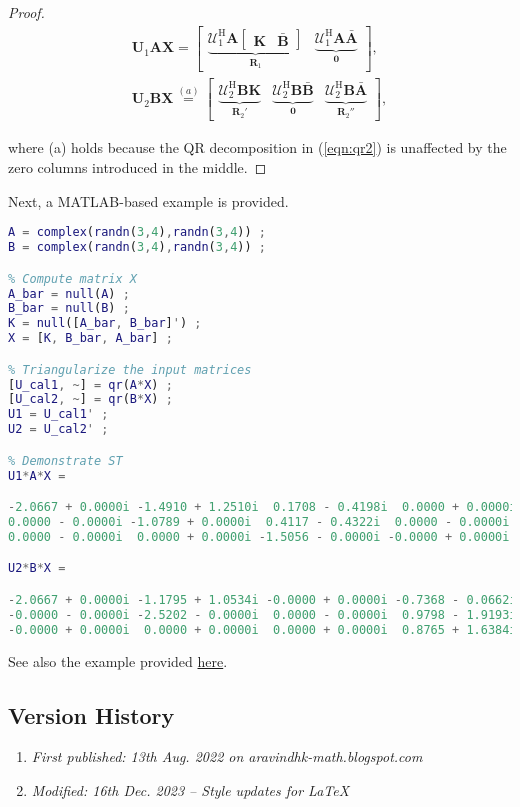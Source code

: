 \begin{proof}
\begin{align}\boldsymbol{U}_1\boldsymbol{A}\boldsymbol{X} = \begin{bmatrix}\underbrace{\boldsymbol{\mathcal{U}}_1^\mathrm{H} \boldsymbol{A} \begin{bmatrix}\boldsymbol{K} & \bar{\boldsymbol{B}}\end{bmatrix}}_{\boldsymbol{R}_1} &  \underbrace{\boldsymbol{\mathcal{U}}_1^\mathrm{H} \boldsymbol{A} \bar{\boldsymbol{A}}}_{\boldsymbol{0}}\end{bmatrix}, \\ \boldsymbol{U}_2\boldsymbol{B}\boldsymbol{X} \overset{(a)}{=} \begin{bmatrix} \underbrace{\boldsymbol{\mathcal{U}}_2^\mathrm{H} \boldsymbol{B} \boldsymbol{K}}_{\boldsymbol{R}_2'} & \underbrace{\boldsymbol{\mathcal{U}}_2^\mathrm{H} \boldsymbol{B} \bar{\boldsymbol{B}}}_{\boldsymbol{0}} &  \underbrace{\boldsymbol{\mathcal{U}}_2^\mathrm{H} \boldsymbol{B} \bar{\boldsymbol{A}}}_{\boldsymbol{R}_2''}\end{bmatrix},\end{align}

where (a) holds because the QR decomposition in (\ref{eqn:qr2}) is unaffected by the zero columns introduced in the middle.
\end{proof}

Next, a MATLAB-based example is provided.

\begin{lstlisting}[language=MATLAB,numbers=none]
% Generate compatible matrices
A = complex(randn(3,4),randn(3,4)) ;
B = complex(randn(3,4),randn(3,4)) ;

% Compute matrix X
A_bar = null(A) ;
B_bar = null(B) ;
K = null([A_bar, B_bar]') ;
X = [K, B_bar, A_bar] ;

% Triangularize the input matrices
[U_cal1, ~] = qr(A*X) ;
[U_cal2, ~] = qr(B*X) ;
U1 = U_cal1' ;
U2 = U_cal2' ;

% Demonstrate ST
U1*A*X =

-2.0667 + 0.0000i -1.4910 + 1.2510i  0.1708 - 0.4198i  0.0000 + 0.0000i
0.0000 - 0.0000i -1.0789 + 0.0000i  0.4117 - 0.4322i  0.0000 - 0.0000i
0.0000 - 0.0000i  0.0000 + 0.0000i -1.5056 - 0.0000i -0.0000 + 0.0000i

U2*B*X =

-2.0667 + 0.0000i -1.1795 + 1.0534i -0.0000 + 0.0000i -0.7368 - 0.0662i
-0.0000 - 0.0000i -2.5202 - 0.0000i  0.0000 - 0.0000i  0.9798 - 1.9193i
-0.0000 + 0.0000i  0.0000 + 0.0000i  0.0000 + 0.0000i  0.8765 + 1.6384i
\end{lstlisting}

See also the example provided \href{https://gitlab.com/aravindh.krishnamoorthy/mimo-noma}{here}.

\subsection{Version History}
\begin{enumerate}
	\item \emph{First published: 13th Aug. 2022 on aravindhk-math.blogspot.com}
	\item \emph{Modified: 16th Dec. 2023 -- Style updates for \LaTeX}
\end{enumerate}
